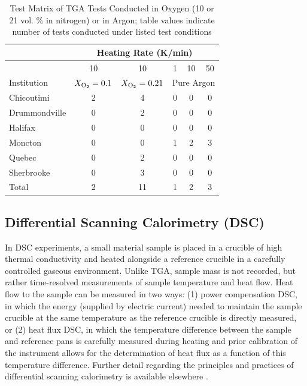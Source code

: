 \documentclass{book}
\begin{document}
\begin{table}
\caption{Test Matrix of TGA Tests Conducted in Oxygen (10 or 21 vol. \% in nitrogen) or in Argon; table values indicate number of tests conducted under listed test conditions}
\label{Table_4}
\begin{center}
\begin{tabular}{lccccc}
              & \multicolumn{5}{c}{Heating Rate (K/min)} \\ \hline
              & 10 & 10 & 1 & 10 & 50  \\ \hline
Institution   & $X_{\rm O_2}=0.1$ & $X_{\rm O_2}=0.21$ & \multicolumn{3}{c}{Pure Argon}  \\ \hline
Chicoutimi    & 2 & 4   & 0 & 0 & 0 \\
Drummondville & 0 & 2   & 0 & 0 & 0 \\
Halifax       & 0 & 0   & 0 & 0 & 0 \\
Moncton       & 0 & 0   & 1 & 2 & 3 \\
Quebec        & 0 & 2   & 0 & 0 & 0 \\
Sherbrooke    & 0 & 3   & 0 & 0 & 0 \\ \hline
Total         & 2 & 11  & 1 & 2 & 3 \\ \hline
\end{tabular}
\end{center}
\end{table}


\subsection{Differential Scanning Calorimetry (DSC)}

In DSC experiments, a small material sample is placed in a crucible of high thermal conductivity and heated alongside a reference crucible in a carefully controlled gaseous environment. Unlike TGA, sample mass is not recorded, but rather time-resolved measurements of sample temperature and heat flow. Heat flow to the sample can be measured in two ways: (1) power compensation DSC, in which the energy (supplied by electric current) needed to maintain the sample crucible at the same temperature as the reference crucible is directly measured, or (2) heat flux DSC, in which the temperature difference between the sample and reference pans is carefully measured during heating and prior calibration of the instrument allows for the determination of heat flux as a function of this temperature difference. Further detail regarding the principles and practices of differential scanning calorimetry is available elsewhere \cite{mcnaughton2003differential}.
\end{document}
